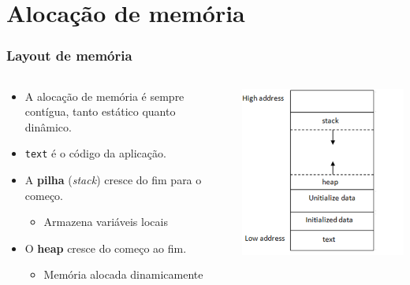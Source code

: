 \documentclass[xcolor={usenames,dvipsnames},12pt,presentation,aspectratio=169]{beamer}
\begin{document}
\section{Alocação de memória}
\begin{frame}
  \frametitle{Layout de memória}
  \vspace{-3mm}
    \begin{columns}
     \begin{column}{0.7\textwidth}
    \begin{itemize}
        \item A alocação de memória é sempre contígua, tanto estático quanto dinâmico.
        \item \texttt{text} é o código da aplicação.
        \item A \textbf{pilha} (\emph{stack}) cresce do fim para o começo.
            \begin{itemize}
                \item Armazena variáveis locais
            \end{itemize}
        \item O \textbf{heap} cresce do começo ao fim.
            \begin{itemize}
                \item  Memória alocada dinamicamente
            \end{itemize}
    \end{itemize}
     \end{column}
      \begin{column}{0.3\textwidth}
  \begin{center}
	\includegraphics[width=\textwidth]{memory_layout.png}
  \end{center}
      \end{column}
    \end{columns}
\end{frame}
\end{document}
